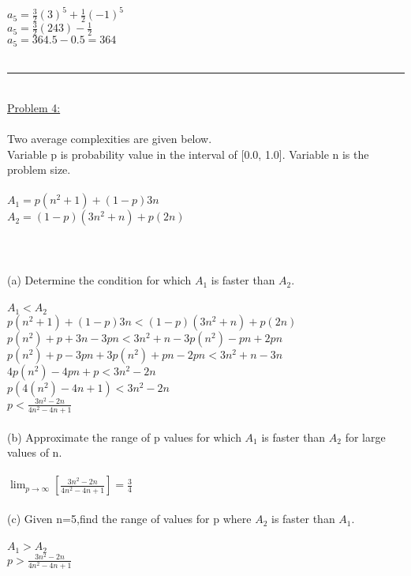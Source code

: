 \documentclass{article}
\begin{document}
    \\
    \indent $a_5 = \frac{3}{2}(3)^5 + \frac{1}{2}(-1)^5$\\
    \indent $a_5 = \frac{3}{2}(243) - \frac{1}{2}$\\
    \indent $a_5 = 364.5 - 0.5 = 364$\\
    \\
    \rule{\textwidth}{0.5pt}\\
    \underline{Problem 4:}\\\\
    Two average complexities are given below.\\Variable p is probability value in the interval of [0.0, 1.0]. Variable n is the problem size. \\
    \\
    $A_1 = p(n^2 + 1) + (1 - p)3n$\\
    $A_2 = (1 - p) (3n^2 + n) + p(2n)$\\
    \\\\\\
    (a) Determine the condition for which $A_1$ is faster than $A_2$.\\
    \\
    \indent $A_1 < A_2$\\
    \indent $p(n^2 + 1) + (1 - p)3n < (1 - p) (3n^2 + n) + p(2n)$\\
    \indent $p(n^2) + p + 3n - 3pn < 3n^2 + n -3p(n^2) - pn + 2pn$\\
    \indent $p(n^2) + p - 3pn + 3p(n^2) + pn - 2pn < 3n^2 + n - 3n$\\
    \indent $4p(n^2) - 4pn + p < 3n^2 - 2n$\\
    \indent $p(4(n^2) - 4n + 1) < 3n^2 - 2n$\\
    \indent $p < \frac{3n^2 - 2n}{4n^2 - 4n + 1}$\\
    \\
    (b) Approximate the range of p values for which $A_1$ is faster than $A_2$ for large values of n.\\
    \\
    \indent $\lim_{p \to \infty} [\frac{3n^2 - 2n}{4n^2 - 4n + 1}] = \frac{3}{4}$\\
    \\
    (c) Given n=5,find the range of values for p where $A_2$ is faster than $A_1$.\\
    \\
    \indent $A_1 > A_2$\\
    \indent $p > \frac{3n^2 - 2n}{4n^2 - 4n + 1}$\\\\
\end{document}
